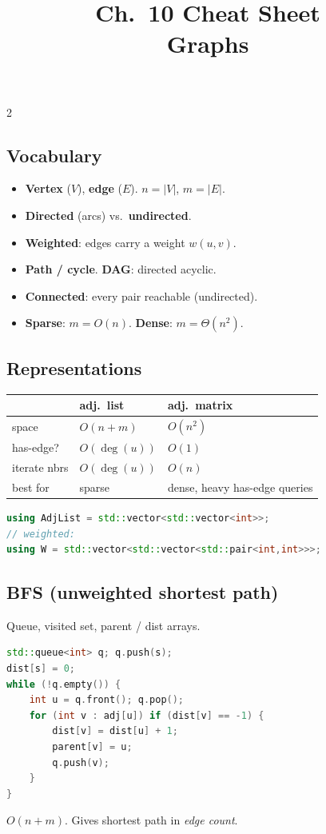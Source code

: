 \documentclass[10pt]{article}
\title{Ch.~10 Cheat Sheet\\\large Graphs}
\author{}
\date{}
\begin{document}
\maketitle
\vspace{-2em}

\begin{multicols}{2}

\subsection*{Vocabulary}
\begin{itemize}
    \item \textbf{Vertex} ($V$), \textbf{edge} ($E$). $n = |V|$, $m = |E|$.
    \item \textbf{Directed} (arcs) vs.\ \textbf{undirected}.
    \item \textbf{Weighted}: edges carry a weight $w(u,v)$.
    \item \textbf{Path / cycle}. \textbf{DAG}: directed acyclic.
    \item \textbf{Connected}: every pair reachable (undirected).
    \item \textbf{Sparse}: $m = O(n)$. \textbf{Dense}: $m = \Theta(n^2)$.
\end{itemize}

\subsection*{Representations}
\begin{tabular}{@{}l|l|l@{}}
             & \textbf{adj.\ list}    & \textbf{adj.\ matrix}\\
\hline
space        & $O(n+m)$               & $O(n^2)$\\
has-edge?    & $O(\deg(u))$           & $O(1)$\\
iterate nbrs & $O(\deg(u))$           & $O(n)$\\
best for     & sparse                 & dense, heavy has-edge queries
\end{tabular}

\begin{lstlisting}[language=C++]
using AdjList = std::vector<std::vector<int>>;
// weighted:
using W = std::vector<std::vector<std::pair<int,int>>>;
\end{lstlisting}

\subsection*{BFS (unweighted shortest path)}
Queue, visited set, parent / dist arrays.
\begin{lstlisting}[language=C++]
std::queue<int> q; q.push(s);
dist[s] = 0;
while (!q.empty()) {
    int u = q.front(); q.pop();
    for (int v : adj[u]) if (dist[v] == -1) {
        dist[v] = dist[u] + 1;
        parent[v] = u;
        q.push(v);
    }
}
\end{lstlisting}
$O(n+m)$. Gives shortest path in \emph{edge count}.


\end{multicols}
\end{document}
